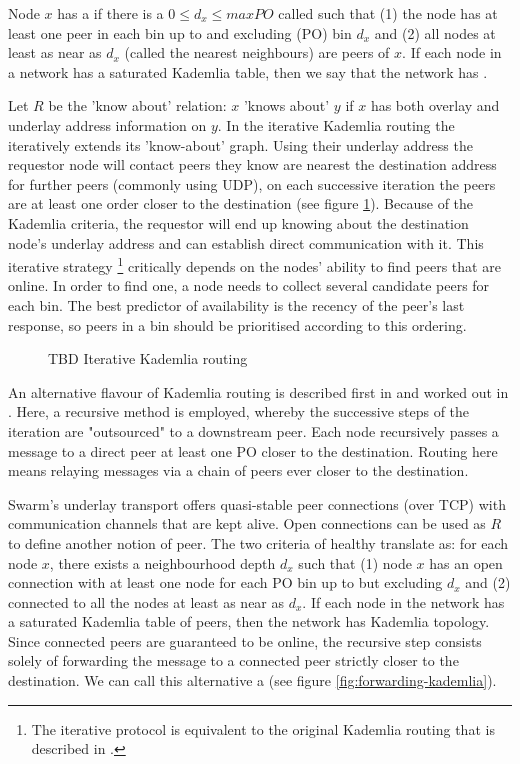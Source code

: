 Node $x$ has a  if there is a $0\leq d_x\leq \mathit{maxPO}$ called  such that (1) the node has at least one peer in each bin up to and excluding  (PO) bin $d_x$ and (2) all nodes at least as near as $d_x$ (called the nearest neighbours) are peers of $x$. If each node in a network has a saturated Kademlia table, then we say that the network has .

Let $R$ be the 'know about' relation:  $x$ 'knows about' $y$ if $x$ has both overlay and underlay address information on $y$. 
In the iterative Kademlia routing the  iteratively extends its 'know-about' graph. Using their underlay address the requestor node will contact peers they know are nearest the destination address for further peers (commonly using UDP), on each successive iteration the peers are at least one order closer to the destination (see figure \ref{fig:iterative-kademlia}). Because of the Kademlia criteria, the requestor will end up knowing about the destination node's underlay address and can establish direct communication with it. This iterative strategy%
%
\footnote{The iterative protocol is equivalent to   the original Kademlia routing that is described in \cite{maymounkov2002kademlia}.
}
%
critically depends on the nodes' ability to find peers that are online. In order to find one, a node needs to collect several candidate peers for each bin. The best predictor of availability is the recency of the peer's last response, so peers in a bin should be prioritised according to this ordering.

\begin{figure}[htbp]
   \centering
   \caption[Iterative Kademlia routing]{TBD Iterative Kademlia routing}
   \label{fig:iterative-kademlia}
\end{figure}


An alternative flavour of Kademlia routing is described first in \cite{heep2010r} and worked out in \cite{tronetal2019-network}. Here, a recursive method is employed, whereby the successive steps of the iteration are "outsourced" to a downstream peer.
Each node recursively passes a message to a direct peer at least one PO closer to the destination. Routing here means relaying messages via a chain of peers ever closer to the destination.

Swarm's underlay transport offers quasi-stable peer connections (over TCP) with communication channels that are kept alive. Open connections can be used as $R$ to define another notion of peer. The two criteria of healthy  translate as: for each node $x$, there exists a neighbourhood depth $d_x$ such that (1) node $x$ has an open connection with at least one node for each PO bin up to but excluding $d_x$ and (2) connected to all the nodes at least as near as $d_x$. If each node in the network has a saturated Kademlia table of peers, then the network has Kademlia topology. Since connected peers are guaranteed to be online, the recursive step consists solely of forwarding the message to a connected peer strictly closer to the destination. We can call this alternative a  (see figure \ref{fig:forwarding-kademlia}). 



